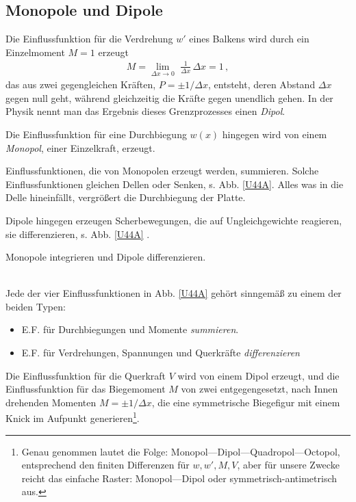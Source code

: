 {\textcolor{sectionTitleBlue}{\section{Monopole und Dipole}}}
Die Einflussfunktion f\"{u}r die Verdrehung $w'$ eines Balkens wird durch ein Einzelmoment $M = 1 $ erzeugt
\begin{align}
M = \lim_{\Delta x \to 0} \,\,\frac{1}{\Delta x}  \, \Delta x = 1\,,
\end{align}
das aus zwei gegengleichen Kr\"{a}ften, $P = \pm 1/\Delta x$, entsteht, deren Abstand $\Delta x $ gegen null geht, w\"{a}hrend gleichzeitig die Kr\"{a}fte gegen unendlich gehen. In der Physik nennt man das Ergebnis dieses Grenzprozesses einen {\em Dipol\/}.

Die Einflussfunktion f\"{u}r eine Durchbiegung $w(x)$ hingegen wird von einem {\em Monopol\/}, einer Einzelkraft, erzeugt.

Einflussfunktionen, die von Monopolen erzeugt werden, summieren. Solche Einflussfunktionen gleichen Dellen oder Senken, s. Abb. \ref{U44A}. Alles was in die Delle hineinf\"{a}llt, vergr\"{o}{\ss}ert die Durchbiegung der Platte.

Dipole hingegen erzeugen Scherbewegungen, die auf Ungleichgewichte reagieren, sie differenzieren, s. Abb. \ref{U44A} .\\

\hspace*{-12pt}\colorbox{highlightBlue}{\parbox{0.98\textwidth}{ Monopole integrieren und Dipole differenzieren.}}\\


Jede der vier Einflussfunktionen in Abb. \ref{U44A} geh\"{o}rt sinngem\"{a}{\ss} zu einem der beiden Typen:\\

\begin{itemize}
  \item E.F. f\"{u}r Durchbiegungen und Momente {\em summieren\/}.
  \item E.F. f\"{u}r Verdrehungen, Spannungen und Querkr\"{a}fte {\em  differenzieren\/}
\end{itemize}

Die Einflussfunktion f\"{u}r die Querkraft $V$ wird von einem Dipol erzeugt, und die Einflussfunktion f\"{u}r das Biegemoment $M$ von zwei entgegengesetzt, nach Innen drehenden Momenten $M = \pm 1/\Delta x$, die eine symmetrische Biegefigur mit einem Knick im Aufpunkt generieren\footnote{Genau genommen lautet die Folge: Monopol---Dipol---Quadropol---Octopol, entsprechend den finiten Differenzen f\"{u}r $w, w', M, V$, aber f\"{u}r unsere Zwecke reicht das einfache Raster: Monopol---Dipol oder symmetrisch-antimetrisch aus.}.

